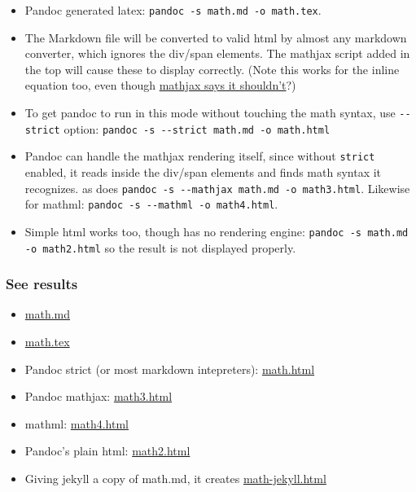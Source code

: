 \documentclass[]{article}
\begin{document}
\begin{itemize}
\item
  Pandoc generated latex: \texttt{pandoc -s math.md -o math.tex}.\\
\item
  The Markdown file will be converted to valid html by almost any
  markdown converter, which ignores the div/span elements. The mathjax
  script added in the top will cause these to display correctly. (Note
  this works for the inline equation too, even though
  \href{http://www.mathjax.org/docs/2.0/start.html\#tex-and-latex-input}{mathjax
  says it shouldn't}?)
\item
  To get pandoc to run in this mode without touching the math syntax,
  use \texttt{-{}-strict} option:
  \texttt{pandoc -s -{}-strict math.md -o math.html}
\item
  Pandoc can handle the mathjax rendering itself, since without
  \texttt{strict} enabled, it reads inside the div/span elements and
  finds math syntax it recognizes. as does
  \texttt{pandoc -s -{}-mathjax math.md -o math3.html}. Likewise for
  mathml: \texttt{pandoc -s -{}-mathml -o math4.html}.
\item
  Simple html works too, though has no rendering engine:
  \texttt{pandoc -s math.md -o math2.html} so the result is not
  displayed properly.
\end{itemize}
\subsubsection{See results}

\begin{itemize}
\item
  \href{https://github.com/cboettig/sandbox/blob/master/math.md}{math.md}
\item
  \href{https://github.com/cboettig/sandbox/blob/master/math.tex}{math.tex}
\item
  Pandoc strict (or most markdown intepreters):
  \href{http://cboettig.github.com/sandbox/math3.html}{math.html}
\item
  Pandoc mathjax:
  \href{http://cboettig.github.com/sandbox/math3.html}{math3.html}
\item
  mathml:
  \href{http://cboettig.github.com/sandbox/math4.html}{math4.html}
\item
  Pandoc's plain html:
  \href{http://cboettig.github.com/sandbox/math2.html}{math2.html}
\item
  Giving jekyll a copy of math.md, it creates
  \href{http://cboettig.github.com/sandbox/math-jekyll.html}{math-jekyll.html}
\end{itemize}
\end{document}
